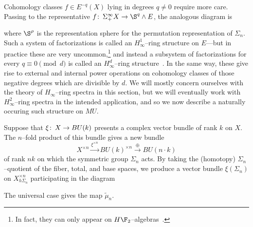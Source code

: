 Cohomology classes \(f \in E^{-q}(X)\) lying in degrees \(q \ne 0\) require more care.  Passing to the representative \(f\co \Susp^\infty_+ X \to \S^q \sm E\), the analogous diagram is
\begin{center}
\end{center}
where \(\S^\rho\) is the representation sphere for the permutation representation of \(\Sigma_n\).  Such a system of factorizations is called an \(H_\infty^1\)--ring structure on \(E\)---but in practice these are very uncommon,\footnote{In fact, they can only appear on \(H\F_2\)--algebras~\cite[Section VII.6.1]{BMMS}.} and instead a subsystem of factorizations for every \(q \equiv 0 \pmod d\) is called an \(H_\infty^d\)--ring structure~\cite[Definition I.4.3]{BMMS}.  In the same way, these give rise to external and internal power operations on cohomology classes of those negative degrees which are divisible by \(d\).  We will mostly concern ourselves with the theory of \(H_\infty\)--ring spectra in this section, but we will eventually work with \(H_\infty^2\)--ring spectra in the intended application, and so we now describe a naturally occuring such structure on \(MU\).

\begin{definition}\label{DefnAssociatedBundle}
Suppose that \(\xi\colon\thinspace X \to BU(k)\) presents a complex vector bundle of rank \(k\) on \(X\).  The \(n\)--fold product of this bundle gives a new bundle \[X^{\times n} \xrightarrow{\xi^{\times n}} BU(k)^{\times n} \xrightarrow{\oplus} BU(n \cdot k)\] of rank \(nk\) on which the symmetric group \(\Sigma_n\) acts.  By taking the (homotopy) \(\Sigma_n\)--quotient of the fiber, total, and base spaces, we produce a vector bundle \(\xi(\Sigma_n)\) on \(X^{\times n}_{h\Sigma_n}\) participating in the diagram
\begin{center}
\end{center}
The universal case gives the map \(\widetilde \mu_n\).
\end{definition}

